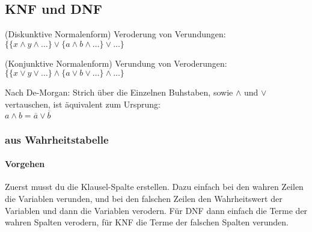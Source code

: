 \documentclass[
    ngerman,
    color=3b,
    summary,
    boxarc,
    main,
    fleqn,
    leqno,
]{rubos-tuda-template}
\begin{document}
    \subsection{KNF und DNF}
    \begin{definition}[DNF]\label{dnf} (Diskunktive Normalenform)
        Veroderung von Verundungen: $\{\{x\land y\land\dots\}\lor\{a\land b\land\dots\}\lor\dots\}$
    \end{definition}
    \begin{definition}[KNF]\label{knf} (Konjunktive Normalenform)
        Verundung von Veroderungen: $\{\{x\lor y\lor\dots\}\land\{a\lor b\lor\dots\}\land\dots\}$
    \end{definition}
    \begin{tipp}
        Nach De-Morgan: Strich über die Einzelnen Buhstaben, sowie $\land$ und $\lor$ vertauschen, ist äquivalent zum Ursprung:\\ 
        $a\land b = \overline{a}\lor \overline{b}$
    \end{tipp}
    \subsubsection{aus Wahrheitstabelle}
    \paragraph{Vorgehen} Zuerst musst du die Klausel-Spalte erstellen.
    Dazu einfach bei den wahren Zeilen die Variablen verunden, und bei den falschen Zeilen den Wahrheitswert der Variablen  und dann die Variablen verodern. Für DNF dann einfach die Terme der wahren Spalten verodern, für KNF die Terme der falschen Spalten verunden.
\end{document}
